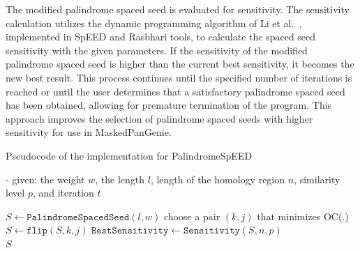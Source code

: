 \documentclass{PHlab-thesis}
\begin{document}
The modified palindrome spaced seed is evaluated for sensitivity. The sensitivity calculation utilizes the dynamic programming algorithm of Li et al.~\cite{Li2004PatternHunter2}, implemented in SpEED and Rasbhari tools, to calculate the spaced seed sensitivity with the given parameters. If the sensitivity of the modified palindrome spaced seed is higher than the current best sensitivity, it becomes the new best result. This process continues until the specified number of iterations is reached or until the user determines that a satisfactory palindrome spaced seed has been obtained, allowing for premature termination of the program. This approach improves the selection of palindrome spaced seeds with higher sensitivity for use in MaskedPanGenie.
\begin{algorithm}
    \caption{Pseudocode of the implementation for PalindromeSpEED}
    \label{alg:PalindromeSpEED}
    - given: the weight $w$, the length $l$, length of the homology region $n$, similarity level $p$, and iteration $t$
    \begin{algorithmic}
        \State $S \gets \texttt{PalindromeSpacedSeed}(l,w)$
                \State choose a pair $(k, j)$ that minimizes OC(.)
                \State $S \gets \texttt{flip}(S,k,j)$
            \EndWhile
                \State $\texttt{BestSensitivity} \gets \texttt{Sensitivity}(S,n,p)$
            \EndIf
        \EndFor\\
        \Return $S$
    \end{algorithmic}
\end{algorithm}
\end{document}
